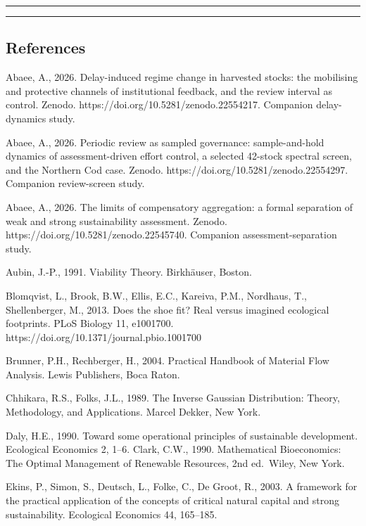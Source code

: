 \documentclass[11pt]{article}
\begin{document}
\begin{center}\rule{0.5\linewidth}{0.5pt}\end{center}

\begin{center}\rule{0.5\linewidth}{0.5pt}\end{center}

\subsection{References}\label{references}

Abaee, A., 2026. Delay-induced regime change in harvested stocks: the
mobilising and protective channels of institutional feedback, and the
review interval as control. Zenodo.
https://doi.org/10.5281/zenodo.22554217. Companion delay-dynamics study.

Abaee, A., 2026. Periodic review as sampled governance: sample-and-hold
dynamics of assessment-driven effort control, a selected 42-stock
spectral screen, and the Northern Cod case. Zenodo.
https://doi.org/10.5281/zenodo.22554297. Companion review-screen study.

Abaee, A., 2026. The limits of compensatory aggregation: a formal
separation of weak and strong sustainability assessment. Zenodo.
https://doi.org/10.5281/zenodo.22545740. Companion assessment-separation
study.

Aubin, J.-P., 1991. Viability Theory. Birkh\"auser, Boston.

Blomqvist, L., Brook, B.W., Ellis, E.C., Kareiva, P.M., Nordhaus, T.,
Shellenberger, M., 2013. Does the shoe fit? Real versus imagined
ecological footprints. PLoS Biology 11, e1001700.
https://doi.org/10.1371/journal.pbio.1001700

Brunner, P.H., Rechberger, H., 2004. Practical Handbook of Material Flow
Analysis. Lewis Publishers, Boca Raton.

Chhikara, R.S., Folks, J.L., 1989. The Inverse Gaussian Distribution:
Theory, Methodology, and Applications. Marcel Dekker, New York.

Daly, H.E., 1990. Toward some operational principles of sustainable
development. Ecological Economics 2, 1--6. Clark, C.W., 1990.
Mathematical Bioeconomics: The Optimal Management of Renewable
Resources, 2nd ed.~Wiley, New York.

Ekins, P., Simon, S., Deutsch, L., Folke, C., De Groot, R., 2003. A
framework for the practical application of the concepts of critical
natural capital and strong sustainability. Ecological Economics 44,
165--185.
\end{document}

